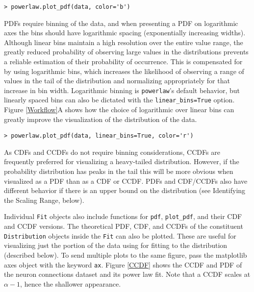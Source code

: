 \documentclass[10pt]{article}
\begin{document}
\begin{verbatim}
> powerlaw.plot_pdf(data, color='b')
\end{verbatim}


PDFs require binning of the data, and when presenting a PDF on logarithmic axes the bins should have logarithmic spacing (exponentially increasing widths). Although linear bins maintain a high resolution over the entire value range, the greatly reduced probability of observing large values in the distributions prevents a reliable estimation of their probability of occurrence. This is compensated for by using logarithmic bins, which increases the likelihood of observing a range of values in the tail of the distribution and normalizing appropriately for that increase in bin width. Logarithmic binning is \verb$powerlaw$'s default behavior, but linearly spaced bins can also be dictated with the \verb"linear_bins=True" option. Figure \ref{Workflow}A shows how the choice of logarithmic over linear bins can greatly improve the visualization of the distribution of the data.

\begin{verbatim}
> powerlaw.plot_pdf(data, linear_bins=True, color='r')
\end{verbatim}

As CDFs and CCDFs do not require binning considerations, CCDFs are frequently preferred for visualizing a heavy-tailed distribution. %
However, if the probability distribution has peaks in the tail this will be more obvious when visualized as a PDF than as a CDF or CCDF. PDFs and CDF/CCDFs also have different behavior if there is an upper bound on the distribution (see Identifying the Scaling Range, below).

Individual \verb$Fit$ objects also include functions for \verb$pdf$, \verb$plot_pdf$, and their CDF and CCDF versions. The theoretical PDF, CDF, and CCDFs of the constituent \verb$Distribution$ objects inside the \verb$Fit$ can also be plotted. These are useful for visualizing just the portion of the data using for fitting to the distribution (described below). To send multiple plots to the same figure, pass the matplotlib axes object with the keyword \verb$ax$.  Figure \ref{CCDF} shows the CCDF and PDF of the neuron connections dataset and its power law fit. Note that a CCDF scales at $\alpha-1$, hence the shallower appearance.
\end{document}

